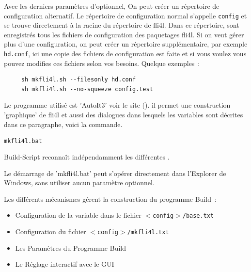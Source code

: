   \bigskip

  Avec les derniers paramètres d'optionnel, On peut créer un répertoire
  de configuration alternatif. Le répertoire de configuration normal s'appelle
  \texttt{config} et se trouve directement à la racine du répertoire de fli4l.
  Dans ce répertoire, sont enregistrés tous les fichiers de configuration des
  paquetages fli4l. Si on veut gérer plus d'une configuration, on peut créer un
  répertoire supplémentaire, par exemple \texttt{hd.conf}, ici une copie des
  fichiers de configuration est faite et si vous voulez vous pouvez modifies
  ces fichiers selon vos besoins. Quelque exemples~:
  \begin{verbatim}
     sh mkfli4l.sh --filesonly hd.conf
     sh mkfli4l.sh --no-squeeze config.test
  \end{verbatim}



  Le programme utilisé est 'AutoIt3' voir le site
  (). il permet une construction
  'graphique' de fli4l et aussi des dialogues dans lesquels les variables
  sont décrites dans ce paragraphe, voici la commande.

  \begin{description}
    \item \texttt{mkfli4l.bat}
  \end{description}

  Build-Script reconnaît indépendamment les différentes .

  Le démarrage de 'mkfli4l.bat' peut s'opérer directement dans
  l'Explorer de Windows, sans utiliser aucun paramètre optionnel.

  Les différents mécanismes gérent la construction du programme Build~:
  \begin{itemize}
    \item Configuration de la variable  dans
      le fichier \texttt{$<$config$>$/base.txt}
    \item Configuration du fichier \texttt{$<$config$>$/mkfli4l.txt}
    \item Les Paramètres du Programme Build
    \item Le Réglage interactif avec le GUI
  \end{itemize}

